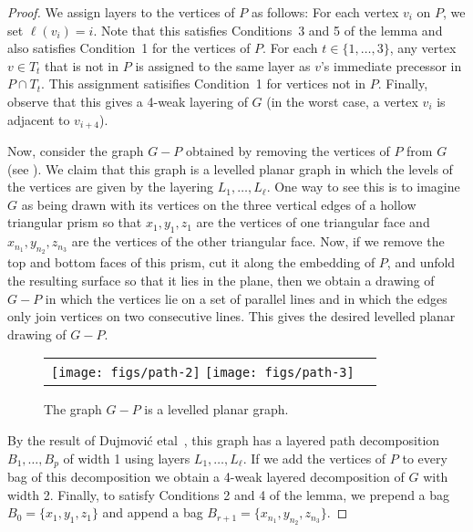 \documentclass{patmorin}
\begin{document}
\begin{proof}
  We assign layers to the vertices of $P$ as follows: For each
  vertex $v_i$ on $P$, we set $\ell(v_i)=i$.  Note that this satisfies
  Conditions~3 and 5 of the lemma and also satisfies Condition~1 for the
  vertices of $P$.  For each $t\in\{1,\ldots,3\}$, any vertex $v\in T_t$
  that is not in $P$ is assigned to the same layer as $v$'s immediate
  precessor in $P\cap T_t$.  This assignment satisifies Condition~1 for
  vertices not in $P$.  Finally, observe that this gives a 4-weak layering
  of $G$ (in the worst case, a vertex $v_i$ is adjacent to $v_{i+4}$).

  Now, consider the graph $G-P$ obtained by removing the vertices of
  $P$ from $G$ (see ).  We claim that this graph is a 
  levelled planar
  graph \cite{jxx} in which the levels of the vertices are given by the
  layering $L_1,\ldots,L_\ell$.  One way to see this is to imagine $G$
  as being drawn with its vertices on the three vertical edges of a
  hollow triangular prism so that $x_1,y_1,z_1$ are the vertices of
  one triangular face and $x_{n_1},y_{n_2},z_{n_3}$ are the vertices
  of the other triangular face.  Now, if we remove the top and bottom
  faces of this prism, cut it along the embedding of $P$, and unfold
  the resulting surface so that it lies in the plane, then we obtain a
  drawing of $G-P$ in which the vertices lie on a set of parallel lines
  and in which the edges only join vertices on two consecutive lines.
  This gives the desired levelled planar drawing of $G-P$.

  \begin{figure}
  \begin{center}
  \begin{tabular}{cc}
  \texttt{[image: figs/path-2]}
  \texttt{[image: figs/path-3]}
  \end{tabular}
  \end{center}
  \caption{The graph $G-P$ is a levelled planar graph.}
  \end{figure}


  By the result of Dujmovi\'c etal\ \cite[Proof of Theorem~5]{jxx},
  this graph has a layered path decomposition $B_1,\ldots,B_p$ of
  width 1 using layers $L_1,\ldots,L_\ell$.  If we add the vertices
  of $P$ to every bag of this decomposition we obtain a 4-weak layered
  decomposition of $G$ with width 2.  Finally, to satisfy Conditions
  2 and 4 of the lemma, we prepend a bag $B_0=\{x_1,y_1,z_1\}$ and append a bag
  $B_{r+1}=\{x_{n_1},y_{n_2},z_{n_3}\}$.
\end{proof}
\end{document}
